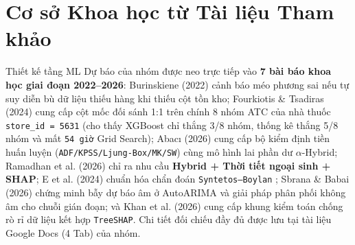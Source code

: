 \section{Cơ sở Khoa học từ Tài liệu Tham khảo}
Thiết kế tầng ML Dự báo của nhóm được neo trực tiếp vào \textbf{7 bài báo khoa học giai đoạn 2022--2026}: Burinskiene (2022) \cite{burinskiene2022} cảnh báo méo phương sai nếu tự suy diễn bù dữ liệu thiếu hàng khi thiếu cột tồn kho; Fourkiotis \& Tsadiras (2024) \cite{fourkiotis2024} cung cấp cột mốc đối sánh 1:1 trên chính 8 nhóm ATC của nhà thuốc \texttt{store\_id = 5631} (cho thấy XGBoost chỉ thắng 3/8 nhóm, thống kê thắng 5/8 nhóm và mất \texttt{54 giờ} Grid Search); Abac\i{} (2026) \cite{abaci2026} cung cấp bộ kiểm định tiền huấn luyện (\texttt{ADF/KPSS/Ljung-Box/MK/SW}) cùng mô hình lai phần dư $\alpha$-Hybrid; Ramadhan et al. (2026) \cite{ramadhan2026} chỉ ra nhu cầu \textbf{Hybrid + Thời tiết ngoại sinh + SHAP}; E et al. (2024) \cite{e2024} chuẩn hóa chẩn đoán \texttt{Syntetos--Boylan} \cite{syntetos2005}; Sbrana \& Babai (2026) \cite{sbrana2026} chứng minh bẫy dự báo âm ở AutoARIMA và giải pháp phân phối không âm cho chuỗi gián đoạn; và Khan et al. (2026) \cite{khan2026} cung cấp khung kiểm toán chống rò rỉ dữ liệu kết hợp \texttt{TreeSHAP}. Chi tiết đối chiếu đầy đủ được lưu tại tài liệu Google Docs (4 Tab) của nhóm.
